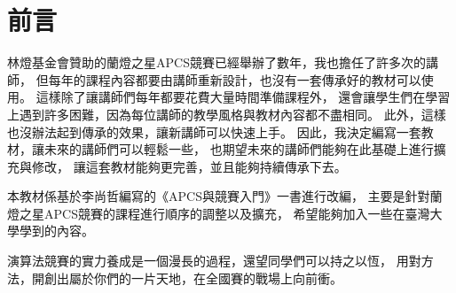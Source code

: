 \chapter*{前言}


林燈基金會贊助的蘭燈之星APCS競賽已經舉辦了數年，我也擔任了許多次的講師，
但每年的課程內容都要由講師重新設計，也沒有一套傳承好的教材可以使用。
這樣除了讓講師們每年都要花費大量時間準備課程外，
還會讓學生們在學習上遇到許多困難，因為每位講師的教學風格與教材內容都不盡相同。
此外，這樣也沒辦法起到傳承的效果，讓新講師可以快速上手。
因此，我決定編寫一套教材，讓未來的講師們可以輕鬆一些，
也期望未來的講師們能夠在此基礎上進行擴充與修改，
讓這套教材能夠更完善，並且能夠持續傳承下去。

本教材係基於李尚哲編寫的《APCS與競賽入門》一書進行改編，
主要是針對蘭燈之星APCS競賽的課程進行順序的調整以及擴充，
希望能夠加入一些在臺灣大學學到的內容。


演算法競賽的實力養成是一個漫長的過程，還望同學們可以持之以恆，
用對方法，開創出屬於你們的一片天地，在全國賽的戰場上向前衝。